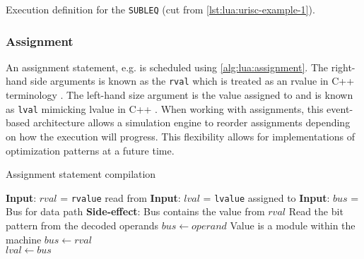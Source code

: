\begin{listing}[h!]
    \inputminted[escapeinside=||, firstline=61, lastline=74]{lua}{./listings/urisc.lua}
    \caption{Execution definition for the \texttt{SUBLEQ}  (cut from \cref{lst:lua:urisc-example-1}).}
    \label{lst:lua:urisc:exec}
\end{listing}

\subsubsection*{Assignment}
\label{sec:lua:sec:instructions:sec:exec:sec:Assignment}

An assignment statement, e.g.  is scheduled using \cref{alg:lua:assignment}. The right-hand side arguments is known as the \texttt{rval} which is treated as an rvalue in C++ terminology \cite{cppreference:ValueCategories}. The left-hand size argument is the value assigned to and is known as \texttt{lval} mimicking lvalue in C++ \cite{cppreference:ValueCategories}. When working with assignments, this event-based architecture allows a simulation engine to reorder assignments depending on how the execution will progress. This flexibility allows for implementations of optimization patterns at a future time. 

\begin{algorithm}[h!]
    \caption{Assignment statement compilation}
    \label{alg:lua:assignment}
    \begin{algorithmic}[1]
        \Statex \textbf{Input}: $rval$ = \texttt{rvalue} read from 
        \Statex \textbf{Input}: $lval$ = \texttt{lvalue} assigned to
        \Statex \textbf{Input}: $bus$ = Bus for data path
        \Statex \textbf{Side-effect}: Bus contains the value from $rval$
        \Statex%
            \State Read the bit pattern from the decoded operands
            \State $bus \gets operand$
        \Else 
            \State Value is a module within the machine
            \State $bus \gets rval$
        \EndIf
        \\
        \State $lval \gets bus$
    \end{algorithmic}
\end{algorithm}


